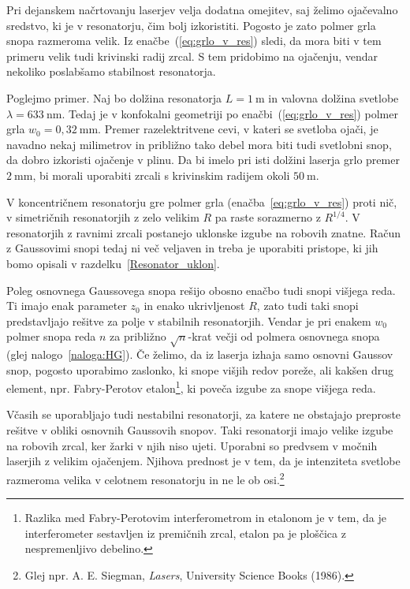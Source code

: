 Pri dejanskem načrtovanju laserjev velja dodatna omejitev, saj želimo 
ojačevalno sredstvo, ki je v resonatorju, čim bolj izkoristiti. Pogosto je zato 
polmer grla snopa razmeroma velik. Iz enačbe~(\ref{eq:grlo_v_res})
sledi, da mora biti v tem primeru velik tudi krivinski radij zrcal. S tem
pridobimo na ojačenju, vendar nekoliko poslabšamo stabilnost resonatorja.

Poglejmo primer. Naj bo dolžina resonatorja $L=1~\si{\metre}$ in valovna
dolžina svetlobe $\lambda = 633~\si{\nano\metre}$. Tedaj je v konfokalni geometriji po enačbi~(\ref{eq:grlo_v_res})
polmer grla $w_{0}=0,32~\si{\milli\metre}$. Premer razelektritvene cevi, v kateri se 
svetloba ojači, je navadno
nekaj milimetrov in približno tako debel mora biti tudi svetlobni
snop, da dobro izkoristi ojačenje v plinu.
Da bi imelo pri isti dolžini laserja grlo premer $2~\si{\milli\metre}$, bi morali
uporabiti zrcali s krivinskim radijem okoli $50~\si{\metre}$. 

V koncentričnem resonatorju gre polmer grla (enačba~\ref{eq:grlo_v_res}) proti nič, v
simetričnih resonatorjih z zelo velikim $R$ pa 
raste sorazmerno z $R^{1/4}$. V resonatorjih z ravnimi zrcali 
postanejo uklonske izgube na robovih znatne. Račun z Gaussovimi snopi tedaj ni več veljaven
in treba je uporabiti pristope, ki jih bomo opisali
v razdelku~\ref{Resonator_uklon}.

Poleg osnovnega Gaussovega snopa rešijo obosno enačbo tudi snopi višjega reda. 
Ti imajo enak parameter $z_{0}$ in enako ukrivljenost $R$, zato tudi taki snopi 
predstavljajo rešitve za polje v stabilnih resonatorjih. Vendar je pri enakem $w_{0}$
polmer snopa reda $n$ za približno $\sqrt{n}$-krat večji od polmera osnovnega snopa
(glej nalogo~\ref{naloga:HG}). Če želimo, da iz laserja izhaja samo 
osnovni Gaussov snop, 
pogosto uporabimo zaslonko, ki snope višjih redov poreže, 
ali kakšen drug element, npr. Fabry-Perotov etalon\footnote{Razlika med Fabry-Perotovim
interferometrom in etalonom je v tem, da je interferometer sestavljen iz premičnih 
zrcal, etalon pa je ploščica z nespremenljivo debelino.}, ki poveča izgube za snope višjega reda.
\begin{remark}
Včasih se uporabljajo tudi nestabilni resonatorji, za 
katere ne obstajajo preproste rešitve v obliki osnovnih Gaussovih snopov. Taki resonatorji 
imajo velike izgube na robovih zrcal, ker žarki v njih niso ujeti. 
Uporabni so predvsem v močnih laserjih z velikim ojačenjem. Njihova prednost je v tem, da 
je intenziteta svetlobe razmeroma velika v celotnem resonatorju in ne le ob 
osi.\footnote{Glej npr. A. E. Siegman, {\it Lasers}, University Science Books (1986).}
\end{remark}

